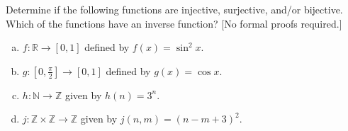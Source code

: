 \documentclass[11pt,letterpaper]{article}
\begin{document}

 Determine if the following functions are injective, surjective, and/or bijective. Which of the functions have an inverse function? [No formal proofs required.]
        \begin{enumerate}[(a)]
        \item $f: \mathbb{R} \to [0,1]$ defined by $f(x)= \sin^2 x$.
        \item $g: [0, \frac{\pi}{2}] \to [0, 1]$ defined by $g(x)= \cos x$.
        \item $h: \mathbb{N} \to \mathbb{Z}$ given by $h(n)= 3^n$.
        \item $j: \mathbb{Z} \times \mathbb{Z} \to \mathbb{Z}$ given by $j(n, m)= (n - m + 3)^2$.
        \end{enumerate} \pspace
\end{document}
